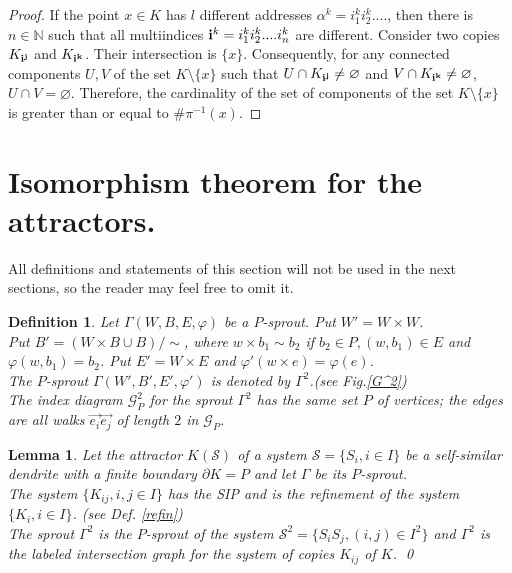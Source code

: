 \documentclass[11pt,reqno]{amsart}
\newtheorem{definition}[theorem]{Definition}
\newtheorem{lemma}[theorem]{Lemma}
\newcommand{\eS}{{\mathcal S}}
\begin{document}
\begin{proof}
If the point $x\in K$ has $l$  different  addresses  $\alpha^k=i^k_1i^k_2....$, then there is $n\in\mathbb{N}$ such that all multiindices ${\bf {i}}^k=i^k_1i^k_2....i^k_n$   are different. 
Consider  two copies $K_{\bf {i}^j}$ and $K_{\bf {i}^k}$. 
Their intersection is $\{x\}$. Consequently, for any connected components $U,V$ of the set $K\setminus\{x\}$ such that $U\cap K_{\bf {i}^j}\neq\varnothing$ and $V\cap K_{\bf {i}^k}\neq\varnothing$, $U\cap V=\varnothing$. Therefore, the cardinality of the set of components of the set $K\setminus\{x\}$ is greater than or equal to $\#\pi^{-1}(x)$.
\end{proof}

\section{Isomorphism theorem  for the attractors.}

 All  definitions and statements of this section will not be used in the next sections,
 so the reader may feel free to omit it.

\begin{definition} 
Let $\Gamma(W,B,E,\varphi)$ be a $P$-sprout. Put $W'=W\times W$.\\ Put $B'=(W\times B\cup B)/\sim$, where $w\times  b_1\sim b_2$ if $b_2\in P, (w,b_1)\in E$ and $\varphi(w,b_1)=b_2$. Put $E'=W\times E$ and $\varphi'(w\times e)=\varphi(e)$.\\
The $P$-sprout $\Gamma(W',B',E', \varphi')$ is denoted by
 $\Gamma^2$.(see Fig.\ref{G^2})\\  
The index diagram ${{\mathcal G}}^2_P$ for the sprout $\Gamma^2$ has the same set $P$ of vertices; the edges are all  walks $\vec{e_i} \vec{e_j}$ of length $2$ in ${{\mathcal G}}_P$.
\end{definition}



\begin{lemma}
Let  the attractor $K({\eS})$ of a system ${\eS}=\{S_i,i\in I\}$  be a self-similar dendrite with  a finite   boundary ${\partial} K=P$ and let $\Gamma$ be its $P$-sprout. \\ The system $\{K_{ij},i,j\in I\}$ has the SIP and is the refinement of the system $\{K_i, i\in I\}$. (see Def. \ref{refin})\\ 
 The sprout $\Gamma^2$ is the $P$-sprout of the system ${\eS}^2=\{S_iS_j,(i,j)\in I^2\}$ and $\Gamma^2$ is the labeled intersection graph for the system of copies $K_{ij}$ of $K$. 
\qed
\end{lemma}
\end{document}
